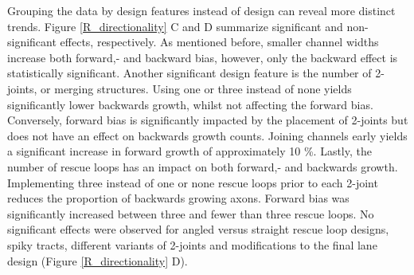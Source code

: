 Grouping the data by design features instead of design can reveal more distinct
trends. Figure \ref{R_directionality} C and D summarize significant and
non-significant effects, respectively. As mentioned before, smaller channel
widths increase both forward,- and backward bias, however, only the backward
effect is statistically significant. Another significant design feature is the
number of 2-joints, or merging structures. Using one or three instead of none
yields significantly lower backwards growth, whilst not affecting the forward
bias. Conversely, forward bias is significantly impacted by the placement of
2-joints but does not have an effect on backwards growth counts. Joining
channels early yields a significant increase in forward growth of approximately
10 \%. Lastly, the number of rescue loops has an impact on both forward,- and
backwards growth. Implementing three instead of one or none rescue loops prior
to each 2-joint reduces the proportion of backwards growing axons. Forward bias
was significantly increased between three and fewer than three rescue loops. No
significant effects were observed for angled versus straight rescue loop
designs, spiky tracts, different variants of 2-joints and modifications to the
final lane design (Figure \ref{R_directionality} D). \\

